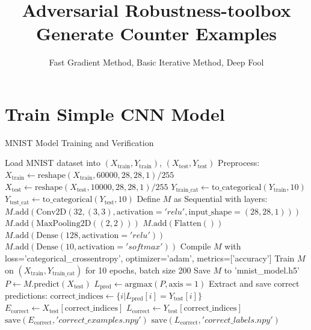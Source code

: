 \documentclass[11pt,onside]{article}
\title{\blue Adversarial Robustness-toolbox \\
\blueb Generate Counter Examples}
\author{Fast Gradient Method, Basic Iterative Method, Deep Fool}
\begin{document}
\maketitle
\section{Train Simple CNN Model}

\begin{algorithm}[H]
\caption{MNIST Model Training and Verification}
\begin{algorithmic}
    

\State Load MNIST dataset into $(X_{\text{train}}, Y_{\text{train}})$, $(X_{\text{test}}, Y_{\text{test}})$
\State Preprocess:
\State $X_{\text{train}} \gets \text{reshape}(X_{\text{train}}, 60000, 28, 28, 1) / 255$
\State $X_{\text{test}} \gets \text{reshape}(X_{\text{test}}, 10000, 28, 28, 1) / 255$
\State $Y_{\text{train\_cat}} \gets \text{to\_categorical}(Y_{\text{train}}, 10)$
\State $Y_{\text{test\_cat}} \gets \text{to\_categorical}(Y_{\text{test}}, 10)$
\State Define $M$ as Sequential with layers:
\State $M.\text{add}(\text{Conv2D}(32, (3, 3), \text{activation}='relu', \text{input\_shape}=(28, 28, 1)))$
\State $M.\text{add}(\text{MaxPooling2D}((2, 2)))$
\State $M.\text{add}(\text{Flatten}())$
\State $M.\text{add}(\text{Dense}(128, \text{activation}='relu'))$
\State $M.\text{add}(\text{Dense}(10, \text{activation}='softmax'))$
\State Compile $M$ with loss='categorical\_crossentropy', optimizer='adam', metrics=['accuracy']
\State Train $M$ on $(X_{\text{train}}, Y_{\text{train\_cat}})$ for 10 epochs, batch size 200
\State Save $M$ to 'mnist\_model.h5'
\State $P \gets M.\text{predict}(X_{\text{test}})$ 
\State $L_{\text{pred}} \gets \text{argmax}(P, \text{axis}=1)$ 
\State Extract and save correct predictions:
\State $ \text{correct\_indices} \gets \{i | L_{\text{pred}}[i] = Y_{\text{test}}[i]\}$
\State $E_{\text{correct}} \gets X_{\text{test}}[\text{correct\_indices}]$
\State $L_{\text{correct}} \gets Y_{\text{test}}[\text{correct\_indices}]$
\State $\text{save}(E_{\text{correct}}, 'correct\_examples.npy')$
\State $\text{save}(L_{\text{correct}}, 'correct\_labels.npy')$

\end{algorithmic}
\end{algorithm}
\end{document}
